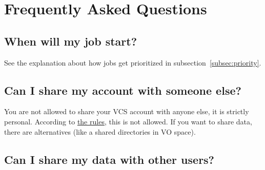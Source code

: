 \chapter{Frequently Asked Questions}
\label{ch:faq}

\ifgent
\section{When will my job start?}

See the explanation about how jobs get prioritized in subsection~\ref{subsec:priority}.

\fi
\section{Can I share my account with someone else?}

 You are not allowed to share your VCS account with anyone else, it is strictly personal.
\ifgent
According to \href{https://helpdesk.ugent.be/account/en/regels.php}{the rules},
this is not allowed.
\fi %
If you want to share data, there are alternatives (like a shared
directories in VO space).

\section{Can I share my data with other \hpc users?}

